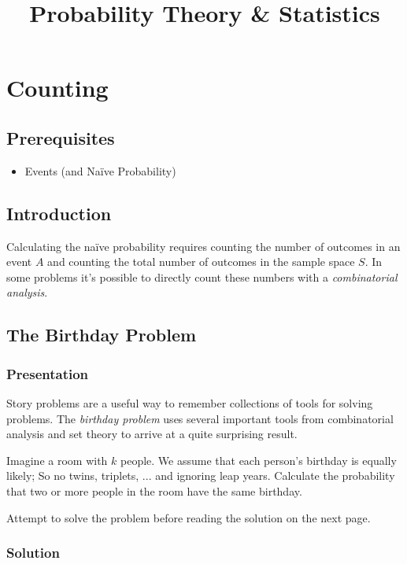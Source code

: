 \documentclass[11pt,a4paper]{article}
\title{Probability Theory \& Statistics}
\begin{document}
\maketitle
\newpage

\section{Counting}

\subsection{Prerequisites}

\begin{itemize}
\item
Events (and Naïve Probability)
\end{itemize}

\subsection{Introduction}

Calculating the naïve probability requires counting 
the number of outcomes in an event \(A\)
and counting the total number of outcomes in the sample space \(S\). 
In some problems it's possible to directly count these numbers with a \emph{combinatorial analysis}. 

\subsection{The Birthday Problem}

\subsubsection{Presentation}

Story problems are a useful way to remember collections of tools for solving problems. 
The \emph{birthday problem} uses several important tools from combinatorial
analysis and set theory to arrive at a quite surprising result.

Imagine a room with \(k\) people. 
We assume that each person's birthday is equally likely;
So no twins, triplets, ... and ignoring leap years.
Calculate the probability that two or more people in the room have the same birthday.

Attempt to solve the problem before reading the solution on the next page.

\clearpage
\subsubsection{Solution}
\end{document}
